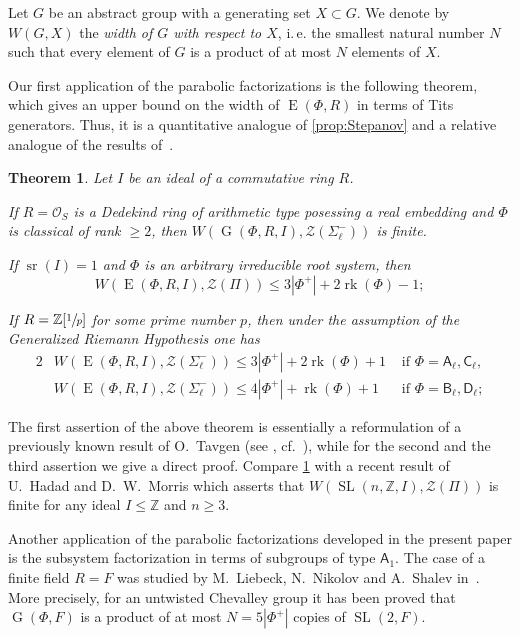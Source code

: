 \documentclass[oneside, 12pt]{amsart}
\theoremstyle{plain}
\newtheorem{thm}{Theorem}
\numberwithin{equation}{section}
\numberwithin{lemma}{section}
\theoremstyle{definition}
\theoremstyle{remark}
\DeclareMathOperator{\G}{G}
\DeclareMathOperator{\SL}{SL}
\DeclareMathOperator{\E}{E}
\DeclareMathOperator{\sr}{sr}
\DeclareMathOperator{\rk}{rk}
\newcommand{\rA}{\mathsf{A}}
\newcommand{\rB}{\mathsf{B}}
\newcommand{\rC}{\mathsf{C}}
\newcommand{\rD}{\mathsf{D}}
\begin{document}
Let $G$ be an abstract group with a generating set $X \subset G$. 
We denote by $W(G, X)$ the \emph{width of $G$ with respect to $X$}, i.\,e. the smallest natural number $N$ such that every element of $G$ is a product of at most $N$ elements of $X$.

Our first application of the parabolic factorizations is the following theorem, which gives an upper bound on the width of $\E(\Phi, R)$ in terms of Tits generators. 
Thus, it is a quantitative analogue of \cref{prop:Stepanov}
and a relative analogue of the results of~\cite{Tavgen91, VseUnitrZ1p, VavSmSuUnitrEng}.
\begin{thm}\label{thm:width} Let $I$ be an ideal of a commutative ring $R$.
\begin{thmlist}
\item If $R=\mathcal{O}_S$ is a Dedekind ring of arithmetic type posessing a real embedding and $\Phi$ is classical of rank $\geqslant2$, then 
$W(\G(\Phi, R, I), \mathcal{Z}(\Sigma_\ell^-))$ is finite.
\item If $\sr(I) = 1$ and $\Phi$ is an arbitrary irreducible root system, then 
\[W(\E(\Phi, R, I), \mathcal{Z}(\Pi))\leqslant 3|\Phi^+|+2\rk(\Phi)-1;\]
\item If $R = \mathbb{Z}[\sfrac{1}{p}]$ for some prime number $p$, then under the assumption of the Generalized Riemann Hypothesis one has
\begin{alignat*}{2}
& W(\E(\Phi, R, I), \mathcal{Z}(\Sigma_\ell^-))\leqslant 3|\Phi^+| + 2\rk(\Phi) + 1 & \text{ if } \Phi=\rA_\ell, \rC_\ell, \\
& W(\E(\Phi, R, I), \mathcal{Z}(\Sigma_\ell^-))\leqslant 4|\Phi^+| + \rk(\Phi) + 1 & \text{ if } \Phi=\rB_\ell, \rD_\ell;
\end{alignat*}
\end{thmlist}
\end{thm}
The first assertion of the above theorem is essentially a reformulation of a previously known result of O.~Tavgen (see \cite{TavgenThesis}, cf.~\cite{Mo07}), 
while for the second and the third assertion we give a direct proof.
Compare \cref{thm:width} with a recent result of U.~Hadad and D.~W.~Morris \cite[Theorem~1.6]{Ha12} which asserts that 
$W(\SL(n, \mathbb{Z}, I), \mathcal{Z}(\Pi))$ is finite for any ideal $I \leq \mathbb{Z}$ and $n \geq 3$.

Another application of the parabolic factorizations developed in the present paper is the subsystem factorization in terms of subgroups of type $\rA_1$.
The case of a finite field $R=F$ was studied by M.~Liebeck, N.~Nikolov and A.~Shalev in~\cite{LNS11}.
More precisely, for an untwisted Chevalley group it has been proved that $\G(\Phi, F)$ is a product of at most $N=5|\Phi^+|$ copies of $\SL(2, F)$.
\end{document}
